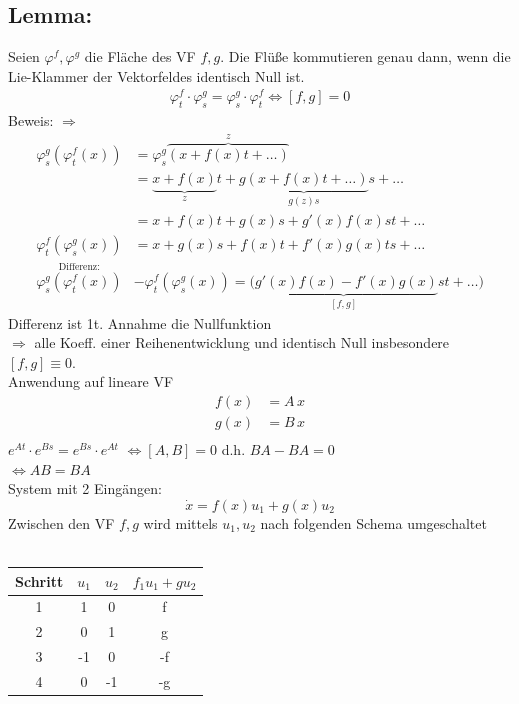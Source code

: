 \documentclass[ngerman]{tudscrreprt}
\begin{document}
\subsection*{Lemma:} Seien $\varphi^f, \varphi^g$ die Fläche des VF $f,g$. Die Flüße kommutieren genau dann, wenn die Lie-Klammer der Vektorfeldes identisch Null ist. 
\begin{align*}
\varphi_t^f\cdot \varphi_s^g = \varphi_s^g \cdot \varphi_t^f \iff [f,g] = 0
\end{align*}
Beweis: $\Rightarrow$
\begin{align*}
\varphi_s^g (\varphi_t^f(x)) &= \varphi_s^g \overbrace{(x + f(x)t + \dots)}^{z} \\ 
&= \underbrace{x + f(x)}_{z} t + \underbrace{g(x + f(x)t+ \dots)}_{g(z)s}s + \dots\\ 
&= x+ f(x)t + g(x)s + g'(x)f(x)st + \dots\\ 
\varphi_t^f(\varphi_s^g(x))&=x+ g(x)s + f(x)t + f'(x)g(x)ts + \dots\\ 
\overset{\text{Differenz:}}{\varphi_s^g(\varphi_t^f(x))}&- \varphi_t^f(\varphi_s^g(x)) = \underbrace{(g'(x)f(x) - f'(x)g(x)}_{[f,g]}st+ \dots )
\end{align*}
Differenz ist 1t. Annahme die Nullfunktion\\ 
$\Rightarrow $ alle Koeff. einer Reihenentwicklung und identisch Null insbesondere $[f,g]\equiv 0$.\\ 
Anwendung auf lineare VF
\begin{align*}
f(x)&= A\,x \\ 
g(x)&= B\,x \\
\end{align*}
$e^{At}\cdot e^{Bs} = e^{Bs} \cdot e^{At}$
$\iff [A,B] = 0$ d.h. $BA - BA = 0$\\ 
$\iff AB = BA$\\ 
System mit 2 Eingängen: 
\begin{equation*}
\dot x = f(x)u_1 + g(x)u_2
\end{equation*}
Zwischen den VF $f,g$ wird mittels $u_1,u_2$ nach folgenden Schema umgeschaltet\\  \\
\begin{tabular}{c | c | c | c }
Schritt & $u_1$ & $u_2$ & $f_1 u_1 + g u_2$ \\ 
\hline
1 & 1 & 0 & f \\ 
2 & 0 & 1 & g \\ 
3 & -1& 0 & -f\\ 
4 & 0 &-1 & -g
\end{tabular}\\ 
\end{document}
